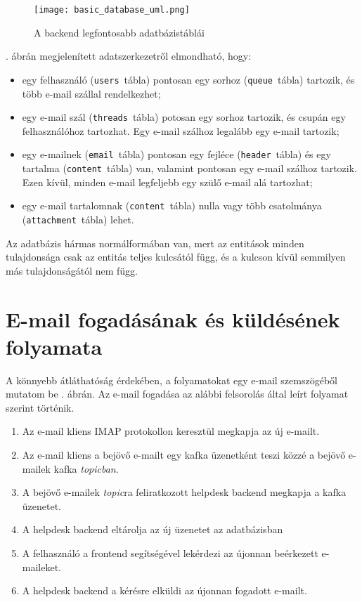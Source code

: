  \begin{figure}[hbt] 
 	\centering
 	\texttt{[image: basic\_database\_uml.png]}
 	\caption{A backend legfontosabb adatbázistáblái}
 	\label{fig:basic_database_uml}
 \end{figure}


. ábrán megjelenített adatszerkezetről elmondható, hogy:
\begin{itemize}
	\item egy felhasználó (\texttt{users}~tábla) pontosan egy sorhoz (\texttt{queue}~tábla) tartozik, és több e-mail szállal rendelkezhet;
	
	\item egy e-mail szál (\texttt{threads}~tábla) potosan egy sorhoz tartozik, és csupán egy felhasználóhoz tartozhat. Egy e-mail szálhoz legalább egy e-mail tartozik;
	
	\item egy e-mailnek (\texttt{email}~tábla) pontosan egy fejléce (\texttt{header}~tábla) és egy tartalma (\texttt{content}~tábla) van, valamint pontosan egy  e-mail szálhoz tartozik. Ezen kívül, minden e-mail legfeljebb egy szülő e-mail alá tartozhat;

	\item egy e-mail tartalomnak (\texttt{content}~tábla) nulla vagy több csatolmánya (\texttt{attachment}~tábla) lehet.
\end{itemize}

Az adatbázis hármas normálformában van, mert az entitások minden tulajdonsága csak az entitás teljes kulcsától függ, és a kulcson kívül semmilyen más tulajdonságától nem függ.



\section{E-mail fogadásának és küldésének folyamata}
A könnyebb átláthatóság érdekében, a folyamatokat egy e-mail szemszögéből mutatom be . ábrán. Az e-mail fogadása az alábbi felsorolás által leírt folyamat szerint történik.
\begin{enumerate}
	\item Az e-mail kliens IMAP protokollon keresztül megkapja az új e-mailt.
	\item Az e-mail kliens a bejövő e-mailt egy kafka üzenetként teszi közzé a bejövő e-mailek kafka \emph{topicban}.
	\item A bejövő e-mailek \emph{topic}ra feliratkozott helpdesk backend megkapja a kafka üzenetet.
	\item A helpdesk backend eltárolja az új üzenetet az adatbázisban
	\item A felhasználó a frontend segítségével lekérdezi az újonnan beérkezett e-maileket.
	\item A helpdesk backend a kérésre elküldi az újonnan fogadott e-mailt.
\end{enumerate}

